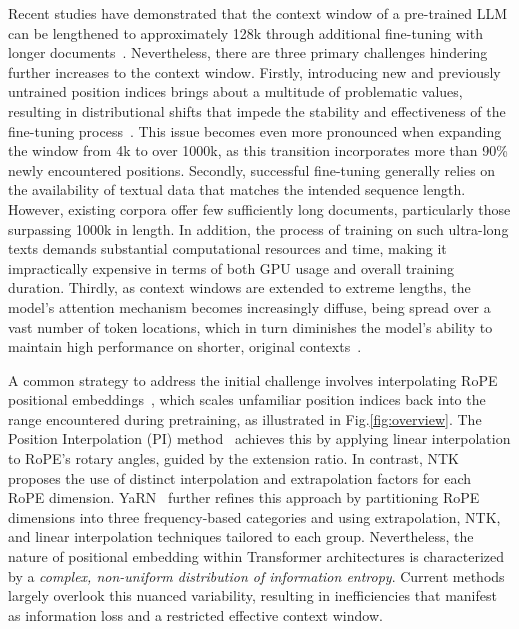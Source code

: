 Recent studies have demonstrated that the context window of a pre-trained LLM can be lengthened to approximately 128k through additional fine-tuning with longer documents~\cite{longlora,pi,yarn,zhang2024soaring,liu2023scaling}. Nevertheless, there are three primary challenges hindering further increases to the context window. Firstly, introducing new and previously untrained position indices brings about a multitude of problematic values, resulting in distributional shifts that impede the stability and effectiveness of the fine-tuning process~\cite{pi}. This issue becomes even more pronounced when expanding the window from 4k to over 1000k, as this transition incorporates more than 90\% newly encountered positions. Secondly, successful fine-tuning generally relies on the availability of textual data that matches the intended sequence length. However, existing corpora offer few sufficiently long documents, particularly those surpassing 1000k in length. In addition, the process of training on such ultra-long texts demands substantial computational resources and time, making it impractically expensive in terms of both GPU usage and overall training duration. Thirdly, as context windows are extended to extreme lengths, the model’s attention mechanism becomes increasingly diffuse, being spread over a vast number of token locations, which in turn diminishes the model’s ability to maintain high performance on shorter, original contexts~\cite{pi}.

A common strategy to address the initial challenge involves interpolating RoPE positional embeddings~\cite{rope,pi}, which scales unfamiliar position indices back into the range encountered during pretraining, as illustrated in Fig.\ref{fig:overview}. The Position Interpolation (PI) method~\cite{pi} achieves this by applying linear interpolation to RoPE's rotary angles, guided by the extension ratio. In contrast, NTK~\cite{ntk,dynamicntk} proposes the use of distinct interpolation and extrapolation factors for each RoPE dimension. YaRN~\cite{yarn} further refines this approach by partitioning RoPE dimensions into three frequency-based categories and using extrapolation, NTK, and linear interpolation techniques tailored to each group. Nevertheless, the nature of positional embedding within Transformer architectures is characterized by a \emph{complex, non-uniform distribution of information entropy}. Current methods largely overlook this nuanced variability, resulting in inefficiencies that manifest as information loss and a restricted effective context window.


